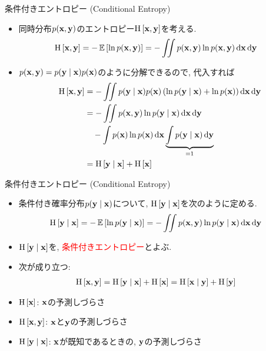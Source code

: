 \documentclass[dvipdfmx,notheorems,t]{beamer}
\begin{document}
\begin{frame}{条件付きエントロピー (Conditional Entropy)}
\begin{itemize}
  \item 同時分布$p(\vb{x}, \vb{y})$のエントロピー$\operatorname{H} \left[ \vb{x}, \vb{y} \right]$を考える.
  \begin{align*}
    \operatorname{H} \left[ \vb{x}, \vb{y} \right] &= -\operatorname{\mathbb{E}} \left[ \ln p(\vb{x}, \vb{y}) \right]
      = - \iint p(\vb{x}, \vb{y}) \ln p(\vb{x}, \vb{y}) \dd{\vb{x}} \dd{\vb{y}}
  \end{align*}
  \item $p(\vb{x}, \vb{y}) = p(\vb{y} \mid \vb{x}) p(\vb{x})$のように分解できるので, 代入すれば
  \begin{align*}
    \operatorname{H} \left[ \vb{x}, \vb{y} \right]
      &= - \iint p(\vb{y} \mid \vb{x}) p(\vb{x})
        \left( \ln p(\vb{y} \mid \vb{x}) + \ln p(\vb{x}) \right) \dd{\vb{x}} \dd{\vb{y}} \\
      &= - \iint p(\vb{x}, \vb{y}) \ln p(\vb{y} \mid \vb{x}) \dd{\vb{x}} \dd{\vb{y}} \\
      & \quad - \int p(\vb{x}) \ln p(\vb{x}) \dd{\vb{x}}
        \underbrace{\int p(\vb{y} \mid \vb{x}) \dd{\vb{y}}}_{=1} \\
      &= \operatorname{H} \left[ \vb{y} \mid \vb{x} \right] + \operatorname{H} \left[ \vb{x} \right]
  \end{align*}
\end{itemize}
\end{frame}

\begin{frame}{条件付きエントロピー (Conditional Entropy)}
\begin{itemize}
  \item 条件付き確率分布$p(\vb{y} \mid \vb{x})$について, $\operatorname{H} \left[ \vb{y} \mid \vb{x} \right]$を次のように定める.
  \begin{align*}
    \operatorname{H} \left[ \vb{y} \mid \vb{x} \right] &= -\operatorname{\mathbb{E}} \left[ \ln p(\vb{y} \mid \vb{x}) \right]
      = - \iint p(\vb{x}, \vb{y}) \ln p(\vb{y} \mid \vb{x}) \dd{\vb{x}} \dd{\vb{y}}
  \end{align*}
  \item $\operatorname{H} \left[ \vb{y} \mid \vb{x} \right]$を, \textcolor{red}{条件付きエントロピー}とよぶ.
  \item 次が成り立つ:
  \begin{align*}
    \operatorname{H} \left[ \vb{x}, \vb{y} \right] &= \operatorname{H} \left[ \vb{y} \mid \vb{x} \right] + \operatorname{H} \left[ \vb{x} \right]
      = \operatorname{H} \left[ \vb{x} \mid \vb{y} \right] + \operatorname{H} \left[ \vb{y} \right]
  \end{align*}
  \item $\operatorname{H} \left[ \vb{x} \right]$: $\vb{x}$の予測しづらさ
  \item $\operatorname{H} \left[ \vb{x}, \vb{y} \right]$: $\vb{x}$と$\vb{y}$の予測しづらさ
  \item $\operatorname{H} \left[ \vb{y} \mid \vb{x} \right]$: $\vb{x}$が既知であるときの, $\vb{y}$の予測しづらさ
\end{itemize}
\end{frame}
\end{document}
